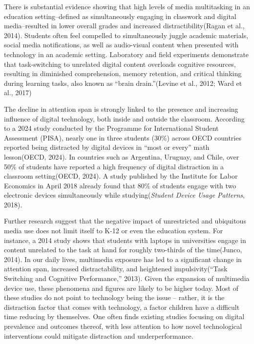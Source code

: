 \documentclass[
  titlepage]{article}
\begin{document}
There is substantial evidence showing that high levels of media
multitasking in an education setting--defined as simultaneously engaging
in classwork and digital media--resulted in lower overall grades and
increased distractibility(Ragan et al., 2014). Students often feel
compelled to simultaneously juggle academic materials, social media
notifications, as well as audio-visual content when presented with
technology in an academic setting. Laboratory and field experiments
demonstrate that task-switching to unrelated digital content overloads
cognitive resources, resulting in diminished comprehension, memory
retention, and critical thinking during learning tasks, also known as
``brain drain.''(Levine et al., 2012; Ward et al., 2017)

The decline in attention span is strongly linked to the presence and
increasing influence of digital technology, both inside and outside the
classroom. According to a 2024 study conducted by the Programme for
International Student Assessment (PISA), nearly one in three students
(30\%) across OECD countries reported being distracted by digital
devices in ``most or every'' math lesson(OECD, 2024). In countries such
as Argentina, Uruguay, and Chile, over 50\% of students have reported a
high frequency of digital distraction in a classroom setting(OECD,
2024). A study published by the Institute for Labor Economics in April
2018 already found that 80\% of students engage with two electronic
devices simultaneously while studying(\emph{Student Device Usage
Patterns}, 2018).

Further research suggest that the negative impact of unrestricted and
ubiquitous media use does not limit itself to K-12 or even the education
system. For instance, a 2014 study shows that students with laptops in
universities engage in content unrelated to the task at hand for roughly
two-thirds of the time(Junco, 2014). In our daily lives, multimedia
exposure has led to a significant change in attention span, increased
distractability, and heightened impulsivity({``Task Switching and
Cognitive Performance,''} 2013). Given the expansion of multimedia
device use, these phenomena and figures are likely to be higher today.
Most of these studies do not point to technology being the issue --
rather, it is the distraction factor that comes with technology, a
factor children have a difficult time reducing by themselves. One often
finds existing studies focusing on digital prevalence and outcomes
thereof, with less attention to how novel technological interventions
could mitigate distraction and underperformance.
\end{document}
